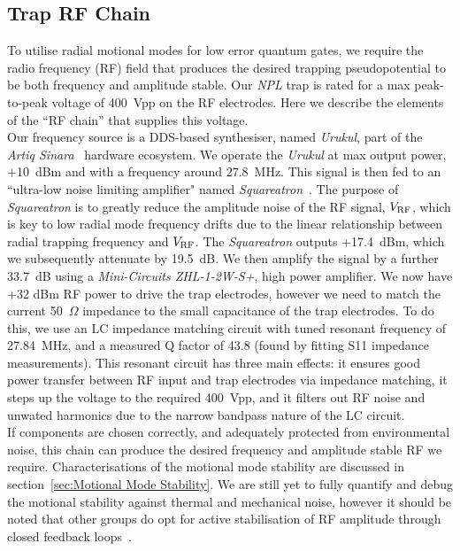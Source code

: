\subsection{Trap RF Chain}
\label{sec:Trap RF Chain}
    To utilise radial motional modes for low error quantum gates, we require the
    radio frequency (RF) field that produces the desired trapping
    pseudopotential to be both frequency and amplitude stable. Our \emph{NPL}
    trap is rated for a max peak-to-peak voltage of 400~Vpp on the RF
    electrodes. Here we describe the elements of the ``RF chain'' that supplies
    this voltage. \\
    Our frequency source is a DDS-based synthesiser, named \emph{Urukul}, part
    of the \emph{Artiq Sinara}~\cite{XXX} hardware ecosystem. We operate the
    \emph{Urukul} at max output power, +10~dBm and with a frequency around $27.8$~MHz. This
    signal is then fed to an ``ultra-low noise limiting amplifier" named
    \emph{Squareatron}~\cite{XXX}. The purpose of \emph{Squareatron} is to
    greatly reduce the amplitude noise of the RF signal, $V_{\rm RF}$, which is
    key to low radial mode frequency drifts due to the linear
    relationship between radial trapping frequency and $V_{\rm RF}$. The \emph{Squareatron} outputs +17.4~dBm,
    which we subsequently attenuate by 19.5~dB. We then amplify the signal by a
    further 33.7~dB using a \emph{Mini-Circuits ZHL-1-2W-S+}, high power
    amplifier. We now have +32 dBm RF power to drive the trap
    electrodes, however we need to match the current 50~$\Omega$ impedance to
    the small capacitance of the trap electrodes. To do this, we use an LC
    impedance matching circuit with tuned resonant frequency of 27.84~MHz, and a
    measured Q factor of 43.8 (found by fitting S11 impedance measurements).
    This resonant circuit has three main effects: it ensures good power transfer
    between RF input and trap electrodes via impedance matching, it steps up the
    voltage to the required 400~Vpp, and it filters out RF noise and unwated harmonics due to
    the narrow bandpass nature of the LC circuit. \\
    If components are chosen correctly, and adequately protected from
    environmental noise, this chain can produce the desired frequency and
    amplitude stable RF we require. Characterisations of the motional mode
    stability are discussed in section~\ref{sec:Motional Mode Stability}. We are
    still yet to fully quantify and debug the motional stability against thermal
    and mechanical noise, however it should be noted that other groups do opt
    for active stabilisation of RF amplitude through closed feedback loops~\cite{XXX}.\\

